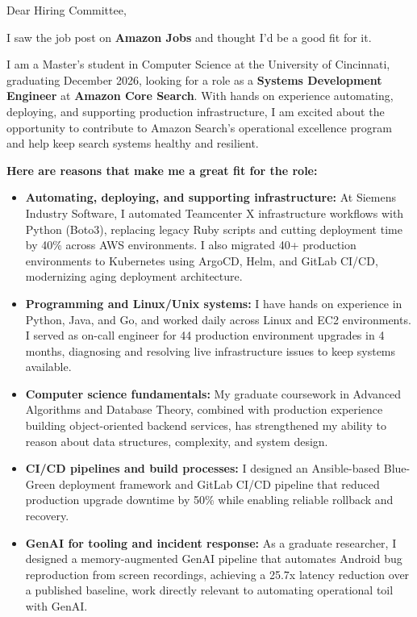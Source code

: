 \documentclass[11pt]{letter}
\date{}
\begin{document}
\begin{letter}{}

\opening{Dear Hiring Committee,}

I saw the job post on \textbf{Amazon Jobs} and thought I'd be a good fit for it.

I am a Master's student in Computer Science at the University of Cincinnati, graduating December 2026, looking for a role as a \textbf{Systems Development Engineer} at \textbf{Amazon Core Search}. With hands on experience automating, deploying, and supporting production infrastructure, I am excited about the opportunity to contribute to Amazon Search's operational excellence program and help keep search systems healthy and resilient.

\textbf{Here are reasons that make me a great fit for the role:}

\begin{itemize}[leftmargin=*, itemsep=0.45em]
    \item \textbf{Automating, deploying, and supporting infrastructure:} At Siemens Industry Software, I automated Teamcenter X infrastructure workflows with Python (Boto3), replacing legacy Ruby scripts and cutting deployment time by 40\% across AWS environments. I also migrated 40+ production environments to Kubernetes using ArgoCD, Helm, and GitLab CI/CD, modernizing aging deployment architecture.

    \item \textbf{Programming and Linux/Unix systems:} I have hands on experience in Python, Java, and Go, and worked daily across Linux and EC2 environments. I served as on-call engineer for 44 production environment upgrades in 4 months, diagnosing and resolving live infrastructure issues to keep systems available.

    \item \textbf{Computer science fundamentals:} My graduate coursework in Advanced Algorithms and Database Theory, combined with production experience building object-oriented backend services, has strengthened my ability to reason about data structures, complexity, and system design.

    \item \textbf{CI/CD pipelines and build processes:} I designed an Ansible-based Blue-Green deployment framework and GitLab CI/CD pipeline that reduced production upgrade downtime by 50\% while enabling reliable rollback and recovery.

    \item \textbf{GenAI for tooling and incident response:} As a graduate researcher, I designed a memory-augmented GenAI pipeline that automates Android bug reproduction from screen recordings, achieving a 25.7x latency reduction over a published baseline, work directly relevant to automating operational toil with GenAI.
\end{itemize}


\end{letter}
\end{document}
